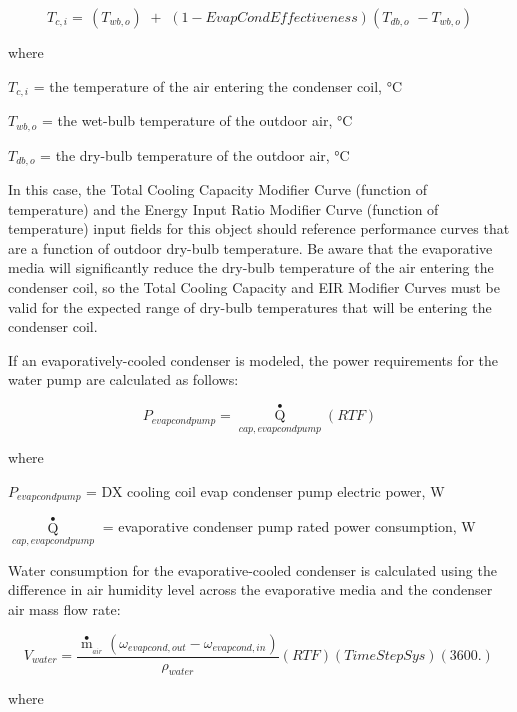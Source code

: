 \begin{equation}
{T_{c,i}} = \,\left( {{T_{wb,o}}} \right)\,\, + \,\,\left( {1 - EvapCondEffectiveness} \right)\left( {{T_{db,o}}\,\, - {T_{wb,o}}} \right)
\end{equation}

where

\(T_{c,i}\) = the temperature of the air entering the condenser coil, °C

\(T_{wb,o}\) = the wet-bulb temperature of the outdoor air, °C

\(T_{db,o}\) = the dry-bulb temperature of the outdoor air, °C

In this case, the Total Cooling Capacity Modifier Curve (function of temperature) and the Energy Input Ratio Modifier Curve (function of temperature) input fields for this object should reference performance curves that are a function of outdoor dry-bulb temperature. Be aware that the evaporative media will significantly reduce the dry-bulb temperature of the air entering the condenser coil, so the Total Cooling Capacity and EIR Modifier Curves must be valid for the expected range of dry-bulb temperatures that will be entering the condenser coil.

If an evaporatively-cooled condenser is modeled, the power requirements for the water pump are calculated as follows:

\begin{equation}
{P_{evapcondpump}} = {\mathop Q\limits^ \bullet_{cap,evapcondpump}}\left( {RTF} \right)
\end{equation}

where

\({P_{evapcondpump}}\) = DX cooling coil evap condenser pump electric power, W

\({\mathop Q\limits^ \bullet_{cap,evapcondpump}}\) = evaporative condenser pump rated power consumption, W

Water consumption for the evaporative-cooled condenser is calculated using the difference in air humidity level across the evaporative media and the condenser air mass flow rate:

\begin{equation}
{V_{water}} = \frac{{{{\mathop m\limits^ \bullet  }_{_{air}}}\left( {{\omega_{evapcond,out}} - {\omega_{evapcond,in}}} \right)}}{{{\rho_{water}}}}\left( {RTF} \right)\left( {TimeStepSys} \right)\left( {3600.} \right)\,
\end{equation}

where

